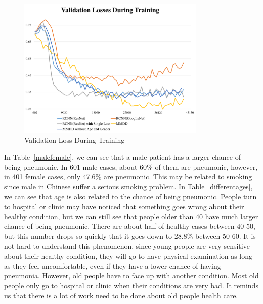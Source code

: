 \documentclass[journal]{IEEEtran}
\begin{document}
\begin{figure}[t]
    \centerline{\includegraphics[width=90mm]{losses.pdf}}
    \vspace{-0cm}
    \caption{Validation Loss During Training}
    \vspace{-0cm}
    \label{loss}
    \end{figure}


In Table~\ref{malefemale}, we can see that a male patient has a larger chance of being pneumonic. In 601 male cases, about 60\% of them are pneumonic, however, in 401 female cases, only 47.6\% are pneumonic. This may be related to smoking since male in Chinese suffer a serious smoking problem. 
In Table~\ref{differentages}, we can see that age is also related to the chance of being pneumonic. People turn to hospital or clinic may have noticed that something goes wrong about their healthy condition, but we can still see that people older than 40 have much larger chance of being pneumonic. There are about half of healthy cases between 40-50, but this number drops so quickly that it goes down to 28.8\% between 50-60. It is not hard to understand this phenomenon, since young people are very sensitive about their healthy condition, they will go to have physical examination as long as they feel uncomfortable, even if they have a lower chance of having pneumonia. However, old people have to face up with another condition. Most old people only go to hospital or clinic when their conditions are very bad. It reminds us that there is a lot of work need to be done about old people health care.
\end{document}
